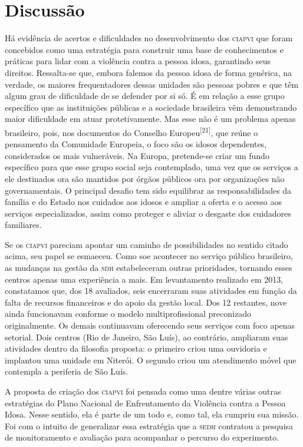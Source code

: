 \documentclass{article}
\begin{document}
\section{Discussão}

Há evidência de acertos e dificuldades no desenvolvimento dos \textsc{ciapvi} que foram
concebidos como uma estratégia para construir uma base de conhecimentos e
práticas para lidar com a violência contra a pessoa idosa, garantindo seus
direitos. Ressalta-se que, embora falemos da pessoa idosa de forma genérica, na
verdade, os maiores frequentadores dessas unidades são pessoas pobres e que têm
algum grau de dificuldade de se defender por si só. É em relação a esse grupo
específico que as instituições públicas e a sociedade brasileira vêm
demonstrando maior dificuldade em atuar protetivamente. Mas esse não é um
problema apenas brasileiro, pois, nos documentos do Conselho
Europeu\textsuperscript{[}\textsuperscript{21}\textsuperscript{]}, que reúne o pensamento da Comunidade Europeia, o foco são os idosos
dependentes, considerados os mais vulneráveis. Na Europa, pretende-se criar um
fundo específico para que esse grupo social seja contemplado, uma vez que os
serviços a ele destinados ora são mantidos por órgãos públicos ora por
organizações não governamentais. O principal desafio tem sido equilibrar as
responsabilidades da família e do Estado nos cuidados aos idosos e ampliar a
oferta e o acesso aos serviços especializados, assim como proteger e aliviar o
desgaste dos cuidadores familiares.

Se os \textsc{ciapvi} pareciam apontar um caminho de possibilidades no sentido citado
acima, seu papel se esmaeceu. Como soe acontecer no serviço público brasileiro,
as mudanças na gestão da \textsc{sdh} estabeleceram outras prioridades, tornando esses
centros apenas uma experiência a mais. Em levantamento realizado em 2013,
constatamos que, dos 18 avaliados, seis encerraram suas atividades em função da
falta de recursos financeiros e do apoio da gestão local. Dos 12 restantes, nove
ainda funcionavam conforme o modelo multiprofissional preconizado originalmente.
Os demais continuavam oferecendo seus serviços com foco apenas setorial. Dois
centros (Rio de Janeiro, São Luís), ao contrário, ampliaram suas atividades
dentro da filosofia proposta: o primeiro criou uma ouvidoria e implantou uma
unidade em Niterói. O segundo criou um atendimento móvel que contempla a
periferia de São Luís.

A proposta de criação dos \textsc{ciapvi} foi pensada como uma dentre várias outras
estratégias do Plano Nacional de Enfrentamento da Violência contra a Pessoa
Idosa. Nesse sentido, ela é parte de um todo e, como tal, ela cumpriu sua
missão. Foi com o intuito de generalizar essa estratégia que a \textsc{sedh} contratou a
pesquisa de monitoramento e avaliação para acompanhar o percurso do experimento.
\end{document}

